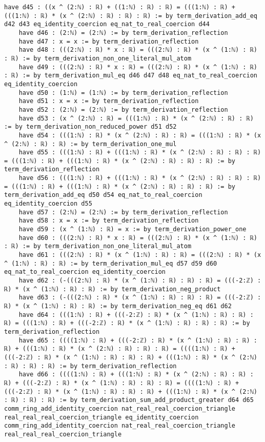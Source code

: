\documentclass{article}
\begin{document}
\begin{tcolorbox}[colback=white!10, width=\linewidth]
\begin{lstlisting}[language=Lean4]
    have d45 : ((x ^ (2:ℕ) : ℝ) + ((1:ℕ) : ℝ) : ℝ) = (((1:ℕ) : ℝ) + (((1:ℕ) : ℝ) * (x ^ (2:ℕ) : ℝ) : ℝ) : ℝ) := by term_derivation_add_eq d42 d43 eq_identity_coercion eq_nat_to_real_coercion d44
    have d46 : (2:ℕ) = (2:ℕ) := by term_derivation_reflection
    have d47 : x = x := by term_derivation_reflection
    have d48 : (((2:ℕ) : ℝ) * x : ℝ) = (((2:ℕ) : ℝ) * (x ^ (1:ℕ) : ℝ) : ℝ) := by term_derivation_non_one_literal_mul_atom
    have d49 : (((2:ℕ) : ℝ) * x : ℝ) = (((2:ℕ) : ℝ) * (x ^ (1:ℕ) : ℝ) : ℝ) := by term_derivation_mul_eq d46 d47 d48 eq_nat_to_real_coercion eq_identity_coercion
    have d50 : (1:ℕ) = (1:ℕ) := by term_derivation_reflection
    have d51 : x = x := by term_derivation_reflection
    have d52 : (2:ℕ) = (2:ℕ) := by term_derivation_reflection
    have d53 : (x ^ (2:ℕ) : ℝ) = (((1:ℕ) : ℝ) * (x ^ (2:ℕ) : ℝ) : ℝ) := by term_derivation_non_reduced_power d51 d52
    have d54 : (((1:ℕ) : ℝ) * (x ^ (2:ℕ) : ℝ) : ℝ) = (((1:ℕ) : ℝ) * (x ^ (2:ℕ) : ℝ) : ℝ) := by term_derivation_one_mul
    have d55 : (((1:ℕ) : ℝ) + (((1:ℕ) : ℝ) * (x ^ (2:ℕ) : ℝ) : ℝ) : ℝ) = (((1:ℕ) : ℝ) + (((1:ℕ) : ℝ) * (x ^ (2:ℕ) : ℝ) : ℝ) : ℝ) := by term_derivation_reflection
    have d56 : (((1:ℕ) : ℝ) + (((1:ℕ) : ℝ) * (x ^ (2:ℕ) : ℝ) : ℝ) : ℝ) = (((1:ℕ) : ℝ) + (((1:ℕ) : ℝ) * (x ^ (2:ℕ) : ℝ) : ℝ) : ℝ) := by term_derivation_add_eq d50 d54 eq_nat_to_real_coercion eq_identity_coercion d55
    have d57 : (2:ℕ) = (2:ℕ) := by term_derivation_reflection
    have d58 : x = x := by term_derivation_reflection
    have d59 : (x ^ (1:ℕ) : ℝ) = x := by term_derivation_power_one
    have d60 : (((2:ℕ) : ℝ) * x : ℝ) = (((2:ℕ) : ℝ) * (x ^ (1:ℕ) : ℝ) : ℝ) := by term_derivation_non_one_literal_mul_atom
    have d61 : (((2:ℕ) : ℝ) * (x ^ (1:ℕ) : ℝ) : ℝ) = (((2:ℕ) : ℝ) * (x ^ (1:ℕ) : ℝ) : ℝ) := by term_derivation_mul_eq d57 d59 d60 eq_nat_to_real_coercion eq_identity_coercion
    have d62 : (-(((2:ℕ) : ℝ) * (x ^ (1:ℕ) : ℝ) : ℝ) : ℝ) = (((-2:ℤ) : ℝ) * (x ^ (1:ℕ) : ℝ) : ℝ) := by term_derivation_neg_product
    have d63 : (-(((2:ℕ) : ℝ) * (x ^ (1:ℕ) : ℝ) : ℝ) : ℝ) = (((-2:ℤ) : ℝ) * (x ^ (1:ℕ) : ℝ) : ℝ) := by term_derivation_neg_eq d61 d62
    have d64 : (((1:ℕ) : ℝ) + (((-2:ℤ) : ℝ) * (x ^ (1:ℕ) : ℝ) : ℝ) : ℝ) = (((1:ℕ) : ℝ) + (((-2:ℤ) : ℝ) * (x ^ (1:ℕ) : ℝ) : ℝ) : ℝ) := by term_derivation_reflection
    have d65 : ((((1:ℕ) : ℝ) + (((-2:ℤ) : ℝ) * (x ^ (1:ℕ) : ℝ) : ℝ) : ℝ) + (((1:ℕ) : ℝ) * (x ^ (2:ℕ) : ℝ) : ℝ) : ℝ) = ((((1:ℕ) : ℝ) + (((-2:ℤ) : ℝ) * (x ^ (1:ℕ) : ℝ) : ℝ) : ℝ) + (((1:ℕ) : ℝ) * (x ^ (2:ℕ) : ℝ) : ℝ) : ℝ) := by term_derivation_reflection
    have d66 : ((((1:ℕ) : ℝ) + (((1:ℕ) : ℝ) * (x ^ (2:ℕ) : ℝ) : ℝ) : ℝ) + (((-2:ℤ) : ℝ) * (x ^ (1:ℕ) : ℝ) : ℝ) : ℝ) = ((((1:ℕ) : ℝ) + (((-2:ℤ) : ℝ) * (x ^ (1:ℕ) : ℝ) : ℝ) : ℝ) + (((1:ℕ) : ℝ) * (x ^ (2:ℕ) : ℝ) : ℝ) : ℝ) := by term_derivation_sum_add_product_greater d64 d65 comm_ring_add_identity_coercion nat_real_real_coercion_triangle real_real_real_coercion_triangle eq_identity_coercion comm_ring_add_identity_coercion nat_real_real_coercion_triangle real_real_real_coercion_triangle

\end{lstlisting}
\end{tcolorbox}
\end{document}
